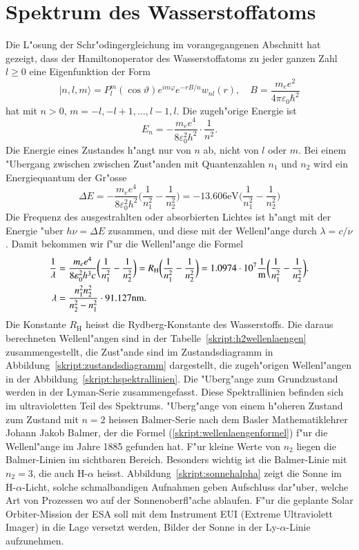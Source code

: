 \section{Spektrum des Wasserstoffatoms}
Die L"osung der Schr"odingergleichung im vorangegangenen Abschnitt
hat gezeigt, dass der Hamiltonoperator des Wasserstoffatoms zu jeder ganzen
Zahl $l\ge 0$ eine Eigenfunktion der Form
\[
|n,l,m\rangle
=
P_l^m(\cos\vartheta) e^{im\varphi}e^{-rB/n}w_{nl}(r)
,\quad
B=\frac{m_ee^2}{4\pi\varepsilon_0\hbar^2}
\]
hat mit $n>0$, $m=-l,-l+1,\dots,l-1,l$.
Die zugeh"orige Energie ist
\[
E_n=-\frac{m_ee^4}{8\varepsilon_0^2h^2}\cdot \frac1{n^2}.
\]
Die Energie eines Zustandes h"angt nur von $n$ ab, nicht von $l$ oder $m$.
Bei einem "Ubergang zwischen zwischen Zust"anden mit Quantenzahlen $n_1$ und
$n_2$ wird ein Energiequantum der Gr"osse
\begin{equation}
\Delta E
=
-\frac{m_ee^4}{8\varepsilon_0^2h^2}
\biggl(
\frac{1}{n_1^2}
-
\frac{1}{n_2^2}
\biggr)
=
-13.606\text{eV}
\biggl(
\frac{1}{n_1^2}
-
\frac{1}{n_2^2}
\biggr)
\end{equation}
Die Frequenz des ausgestrahlten oder absorbierten Lichtes ist h"angt
mit der Energie "uber $h\nu=\Delta E$ zusammen, und diese mit der
Wellenl"ange durch $\lambda = c/\nu$.
Damit bekommen wir f"ur die Wellenl"ange die Formel
\begin{align}
\frac{1}{\lambda}
&=
\frac{m_ee^4}{8\varepsilon_0^2h^3c}
\biggl(
\frac{1}{n_1^2}
-
\frac{1}{n_2^2}
\biggr)
=
R_{\text{H}}
\biggl(
\frac{1}{n_1^2}
-
\frac{1}{n_2^2}
\biggr)
=
1.0974\cdot 10^7\frac1{\text{m}}
\biggl(
\frac{1}{n_1^2}
-
\frac{1}{n_2^2}
\biggr).
\notag
\\
\lambda
&=
\frac{n_1^2n_2^2}{n_2^2-n_1^2}
\cdot
91.127\text{nm}.
\label{skript:wellenlaengenformel}
\end{align}
Die Konstante $R_{\text{H}}$ heisst die Rydberg-Konstante des
Wasserstoffs.
Die daraus berechneten Wellenl"angen sind in der
Tabelle~\ref{skript:h2wellenlaengen} zusammengestellt, die
Zust"ande sind im Zustandsdiagramm in Abbildung~\ref{skript:zustandsdiagramm}
dargestellt, die zugeh"origen Wellenl"angen in der
Abbildung~\ref{skript:hspektrallinien}.
Die "Uberg"ange zum Grundzustand werden in der Lyman-Serie zusammengefasst.
Diese Spektrallinien befinden sich im ultravioletten Teil des Spektrums.
"Uberg"ange von einem h"oheren Zustand zum Zustand mit $n=2$ 
heissen Balmer-Serie nach dem Basler Mathematiklehrer Johann Jakob Balmer,
der die Formel (\ref{skript:wellenlaengenformel}) f"ur die Wellenl"ange 
im Jahre 1885 gefunden hat.
F"ur kleine Werte von $n_2$ liegen die Balmer-Linien im sichtbaren Bereich.
Besonders wichtig ist die Balmer-Linie mit $n_2=3$, die auch H-$\alpha$
heisst.
Abbildung~\ref{skript:sonnehalpha} zeigt die Sonne im H-$\alpha$-Licht,
solche schmalbandigen Aufnahmen geben Aufschluss dar"uber, welche Art von
Prozessen wo auf der Sonnenoberfl"ache ablaufen.
F"ur die geplante Solar Orbiter-Mission der ESA soll mit dem Instrument
EUI (Extreme Ultraviolett Imager) in die Lage versetzt werden, Bilder
der Sonne in der Ly-$\alpha$-Linie aufzunehmen.

